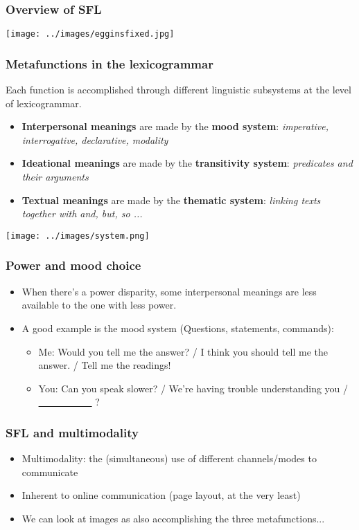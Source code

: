 \documentclass{beamer}       %
\begin{document}
 \begin{frame}
    \frametitle{Overview of SFL}
    \centering
    \texttt{[image: ../images/egginsfixed.jpg]}
\end{frame}

 \begin{frame}
 \frametitle{Metafunctions in the lexicogrammar}
 Each function is accomplished through different linguistic subsystems at the level of lexicogrammar.
 \begin{itemize}
     	\item \textbf{Interpersonal meanings} are made by the \textbf{mood system}: \emph{imperative, interrogative, declarative, modality}
     	\item \textbf{Ideational meanings} are made by the \textbf{transitivity system}: \emph{predicates and their arguments}
     	\item \textbf{Textual meanings} are made by the \textbf{thematic system}: \emph{linking texts together with \emph{and}, \emph{but}, \emph{so} ... }
     \end{itemize}
     \end{frame}
 
  \begin{frame}
    \centering
    \texttt{[image: ../images/system.png]}
  \end{frame}

\begin{frame}
\frametitle{Power and mood choice}
\begin{itemize}
	\item When there's a power disparity, some interpersonal meanings are less available to the one with less power.
	\item A good example is the mood system (Questions, statements, commands):
\begin{itemize}
	\item Me: Would you tell me the answer? / I think you should tell me the answer. / Tell me the readings!
	\item You: Can you speak slower? / We're having trouble understanding you / \underline{~~~~~~~~~~~} ?
\end{itemize}
\end{itemize}
\end{frame}


\begin{frame}
\frametitle{SFL and multimodality}
\begin{itemize}
\item Multimodality: the (simultaneous) use of different channels/modes to communicate
\item Inherent to online communication (page layout, at the very least)
\item We can look at images as also accomplishing the three metafunctions...
\end{itemize}
\end{frame}
 
\end{document}
